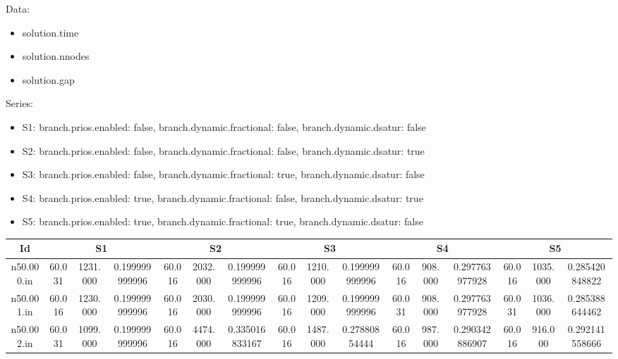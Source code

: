 \documentclass[landscape, 12pt]{report}
\begin{document}
Data:
\begin{itemize}
\item solution.time
\item solution.nnodes
\item solution.gap
\end{itemize}
Series:
\begin{itemize}
\item S1: branch.prios.enabled: false, branch.dynamic.fractional: false, branch.dynamic.dsatur: false
\item S2: branch.prios.enabled: false, branch.dynamic.fractional: false, branch.dynamic.dsatur: true
\item S3: branch.prios.enabled: false, branch.dynamic.fractional: true, branch.dynamic.dsatur: false
\item S4: branch.prios.enabled: true, branch.dynamic.fractional: false, branch.dynamic.dsatur: true
\item S5: branch.prios.enabled: true, branch.dynamic.fractional: true, branch.dynamic.dsatur: false
\end{itemize}
\begin{tabular}{|c|ccc|ccc|ccc|ccc|ccc|}
\hline
\multicolumn{1}{|c|}{Id} & \multicolumn{3}{|c|}{S1} & \multicolumn{3}{|c|}{S2} & \multicolumn{3}{|c|}{S3} & \multicolumn{3}{|c|}{S4} & \multicolumn{3}{|c|}{S5}
\\
\hline
n50.000.in & 60.031 & 1231.000 & 0.199999999996 & 60.016 & 2032.000 & 0.199999999996 & 60.016 & 1210.000 & 0.199999999996 & 60.016 & 908.000 & 0.297763977928 & 60.016 & 1035.000 & 0.285420848822
\\
n50.001.in & 60.016 & 1230.000 & 0.199999999996 & 60.016 & 2030.000 & 0.199999999996 & 60.016 & 1209.000 & 0.199999999996 & 60.031 & 908.000 & 0.297763977928 & 60.031 & 1036.000 & 0.285388644462
\\
n50.002.in & 60.031 & 1099.000 & 0.199999999996 & 60.016 & 4474.000 & 0.335016833167 & 60.016 & 1487.000 & 0.27880854444 & 60.016 & 987.000 & 0.290342886907 & 60.016 & 916.000 & 0.292141558666
\\
\hline 
 \end{tabular}
\end{document}
